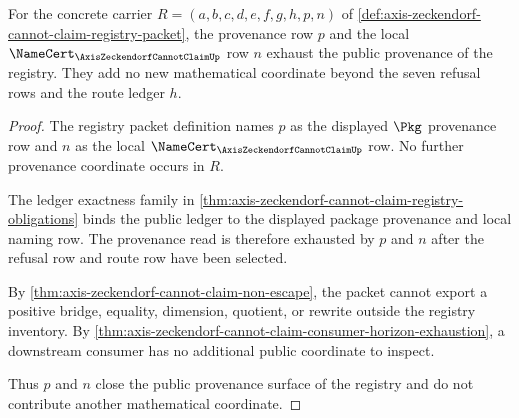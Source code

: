 \begin{theorem}
\label{thm:axis-zeckendorf-cannot-claim-provenance-exhaustion}
For the concrete carrier $R=(a,b,c,d,e,f,g,h,p,n)$ of \autoref{def:axis-zeckendorf-cannot-claim-registry-packet}, the provenance row $p$ and the local $\NameCert_{\AxisZeckendorfCannotClaimUp}$ row $n$ exhaust the public provenance of the registry. They add no new mathematical coordinate beyond the seven refusal rows and the route ledger $h$.
\end{theorem}
\begin{proof}
The registry packet definition names $p$ as the displayed $\Pkg$ provenance row and $n$ as the local $\NameCert_{\AxisZeckendorfCannotClaimUp}$ row. No further provenance coordinate occurs in $R$.

The ledger exactness family in \autoref{thm:axis-zeckendorf-cannot-claim-registry-obligations} binds the public ledger to the displayed package provenance and local naming row. The provenance read is therefore exhausted by $p$ and $n$ after the refusal row and route row have been selected.

By \autoref{thm:axis-zeckendorf-cannot-claim-non-escape}, the packet cannot export a positive bridge, equality, dimension, quotient, or rewrite outside the registry inventory. By \autoref{thm:axis-zeckendorf-cannot-claim-consumer-horizon-exhaustion}, a downstream consumer has no additional public coordinate to inspect.

Thus $p$ and $n$ close the public provenance surface of the registry and do not contribute another mathematical coordinate.
\end{proof}


